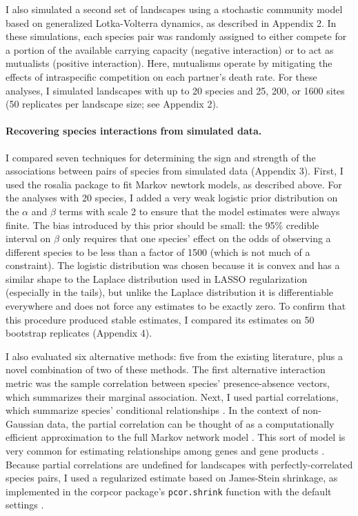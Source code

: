 I also simulated a second set of landscapes using a stochastic community
model based on generalized Lotka-Volterra dynamics, as described in
Appendix 2. In these simulations, each species pair was randomly
assigned to either compete for a portion of the available carrying
capacity (negative interaction) or to act as mutualists (positive
interaction). Here, mutualisms operate by mitigating the effects of
intraspecific competition on each partner's death rate. For these
analyses, I simulated landscapes with up to 20 species and 25, 200, or
1600 sites (50 replicates per landscape size; see Appendix 2).

\paragraph{Recovering species interactions from simulated
data.}\label{recovering-species-interactions-from-simulated-data.}

I compared seven techniques for determining the sign and strength of the
associations between pairs of species from simulated data (Appendix 3).
First, I used the rosalia package \citep{harris_rosalia_2015} to fit
Markov newtork models, as described above. For the analyses with 20
species, I added a very weak logistic prior distribution on the
\(\alpha\) and \(\beta\) terms with scale 2 to ensure that the model
estimates were always finite. The bias introduced by this prior should
be small: the 95\% credible interval on \(\beta\) only requires that one
species' effect on the odds of observing a different species to be less
than a factor of 1500 (which is not much of a constraint). The logistic
distribution was chosen because it is convex and has a similar shape to
the Laplace distribution used in LASSO regularization (especially in the
tails), but unlike the Laplace distribution it is differentiable
everywhere and does not force any estimates to be exactly zero. To
confirm that this procedure produced stable estimates, I compared its
estimates on 50 bootstrap replicates (Appendix 4).

I also evaluated six alternative methods: five from the existing
literature, plus a novel combination of two of these methods. The first
alternative interaction metric was the sample correlation between
species' presence-absence vectors, which summarizes their marginal
association. Next, I used partial correlations, which summarize species'
conditional relationships
\citep{albrecht_spatial_2001, faisal_inferring_2010}. In the context of
non-Gaussian data, the partial correlation can be thought of as a
computationally efficient approximation to the full Markov network model
\citep{loh_structure_2013}. This sort of model is very common for
estimating relationships among genes and gene products
\citep{friedman_sparse_2008}. Because partial correlations are undefined
for landscapes with perfectly-correlated species pairs, I used a
regularized estimate based on James-Stein shrinkage, as implemented in
the corpcor package's \texttt{pcor.shrink} function with the default
settings \citep{schafer_corpcor_2014}.

